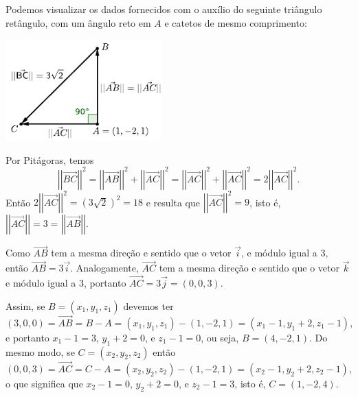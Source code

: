 \documentclass[12pt,a4paper]{article}
\newcommand{\vect}[1]{\overrightarrow{#1}}
\newcommand{\norm}[1]{\left|\left|{#1}\right|\right|}
\begin{document}
\begin{enumerate}
Podemos visualizar os dados fornecidos com o auxílio do seguinte triângulo retângulo, com um ângulo reto em $A$ e catetos de mesmo comprimento:

\includegraphics[width=6.0cm]{img/prova-1-pro-fig3}

Por Pitágoras, temos
\[
\norm{\vect{BC}}^2
= \norm{\vect{AB}}^2 + \norm{\vect{AC}}^2
= \norm{\vect{AC}}^2 + \norm{\vect{AC}}^2
= 2 \norm{\vect{AC}}^2.
\]
Então $2 \norm{\vect{AC}}^2 = (3\sqrt{2})^2 = 18$ e resulta que $\norm{\vect{AC}}^2 = 9$, isto é, $\norm{\vect{AC}} = 3 = \norm{\vect{AB}}$.


Como $\vect{AB}$ tem a mesma direção e sentido que o vetor $\vec{i}$, e módulo igual a 3, então $\vect{AB} = 3\vec{i}$. Analogamente, $\vect{AC}$ tem a mesma direção e sentido que o vetor $\vec{k}$ e módulo igual a 3, portanto $\vect{AC} = 3\vec{j} = (0,0,3)$.

Assim, se $B=(x_1,y_1,z_1)$ devemos ter
\[
(3,0,0) = \vect{AB}
        = B-A
        = (x_1, y_1, z_1) - (1,-2,1)
        = (x_1 - 1,y_1 + 2,z_1 - 1),
\]
e portanto $x_1 - 1 = 3$, $y_1 + 2 = 0$, e $z_1 - 1 = 0$, ou seja, $B = (4,-2,1)$. Do mesmo modo, se $C=(x_2,y_2,z_2)$ então
\[
(0,0,3) = \vect{AC}
        = C-A
        = (x_2, y_2, z_2) - (1,-2,1)
        = (x_2 - 1, y_2 + 2, z_2 - 1),
\]
o que significa que $x_2 - 1 = 0$, $y_2 + 2 = 0$, e $z_2 - 1 = 3$, isto é, $C = (1,-2,4)$.
\end{enumerate}
\end{document}
